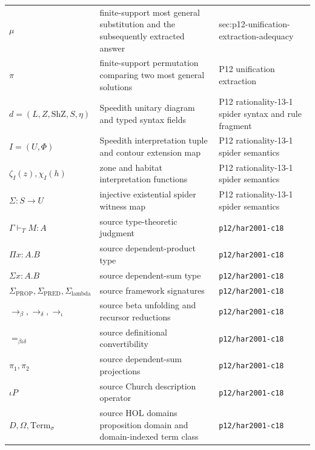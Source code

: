 \begin{longtable}{@{}p{}p{}p{}@{}}
\(\mu\) & finite-support most general substitution and the subsequently extracted answer & sec:\allowbreak{}p12-\allowbreak{}unification-\allowbreak{}extraction-\allowbreak{}adequacy \\
\(\pi\) & finite-support permutation comparing two most general solutions & P12 unification extraction \\
\(d=(L,\allowbreak Z,\allowbreak \mathrm{ShZ},\allowbreak S,\allowbreak \eta)\) & Speedith unitary diagram and typed syntax fields & P12 rationality-\allowbreak{}13-\allowbreak{}1 spider syntax and rule fragment \\
\(I=(U,\allowbreak \Phi)\) & Speedith interpretation tuple and contour extension map & P12 rationality-\allowbreak{}13-\allowbreak{}1 spider semantics \\
\(\zeta_I(z),\allowbreak \chi_I(h)\) & zone and habitat interpretation functions & P12 rationality-\allowbreak{}13-\allowbreak{}1 spider semantics \\
\(\Sigma:S\to U\) & injective existential spider witness map & P12 rationality-\allowbreak{}13-\allowbreak{}1 spider semantics \\
\(\Gamma\vdash_T M:A\) & source type-theoretic judgment & \texttt{p12/\allowbreak{}har2001-\allowbreak{}c18} \\
\(\Pi x:A.B\) & source dependent-product type & \texttt{p12/\allowbreak{}har2001-\allowbreak{}c18} \\
\(\Sigma x:A.B\) & source dependent-sum type & \texttt{p12/\allowbreak{}har2001-\allowbreak{}c18} \\
\(\Sigma_{\mathrm{PROP}},\allowbreak \Sigma_{\mathrm{PRED}},\allowbreak \Sigma_{\mathrm{lambda}}\) & source framework signatures & \texttt{p12/\allowbreak{}har2001-\allowbreak{}c18} \\
\(\to_\beta,\allowbreak \to_\delta,\allowbreak \to_\iota\) & source beta unfolding and recursor reductions & \texttt{p12/\allowbreak{}har2001-\allowbreak{}c18} \\
\(=_{\beta\iota\delta}\) & source definitional convertibility & \texttt{p12/\allowbreak{}har2001-\allowbreak{}c18} \\
\(\pi_1,\allowbreak \pi_2\) & source dependent-sum projections & \texttt{p12/\allowbreak{}har2001-\allowbreak{}c18} \\
\(\iota P\) & source Church description operator & \texttt{p12/\allowbreak{}har2001-\allowbreak{}c18} \\
\(D,\allowbreak \Omega,\allowbreak \mathrm{Term}_\sigma\) & source HOL domains proposition domain and domain-indexed term class & \texttt{p12/\allowbreak{}har2001-\allowbreak{}c18} \\

\end{longtable}
